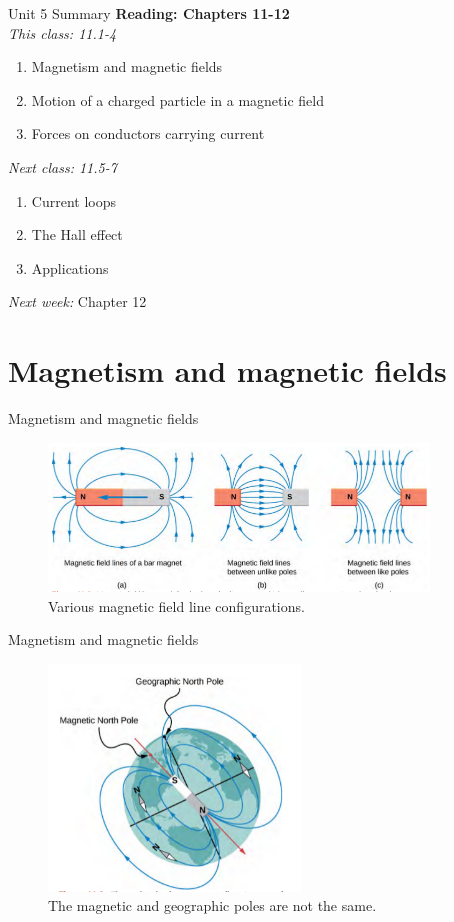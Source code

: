 \documentclass{beamer}
\begin{document}
\begin{frame}{Unit 5 Summary}
\textbf{Reading: Chapters 11-12} \\ \vspace{0.5cm}
\textit{This class: 11.1-4}
\begin{enumerate}
\item Magnetism and magnetic fields
\item Motion of a charged particle in a magnetic field
\item Forces on conductors carrying current
\end{enumerate}
\textit{Next class: 11.5-7}
\begin{enumerate}
\item Current loops
\item The Hall effect
\item Applications
\end{enumerate}
\textit{Next week:} Chapter 12
\end{frame}

\section{Magnetism and magnetic fields}

\begin{frame}{Magnetism and magnetic fields}
\begin{figure}
\centering
\includegraphics[width=0.9\textwidth,trim=0cm 1cm 0cm 0cm,clip=true]{figures/fields1.png}
\caption{\label{fields1} Various magnetic field line configurations.}
\end{figure}
\end{frame}

\begin{frame}{Magnetism and magnetic fields}
\begin{figure}
\centering
\includegraphics[width=0.6\textwidth,trim=0cm 0.1cm 0cm 0cm,clip=true]{figures/fields2.png}
\caption{\label{fields2} The magnetic and geographic poles are not the same.}
\end{figure}
\end{frame}
\end{document}
